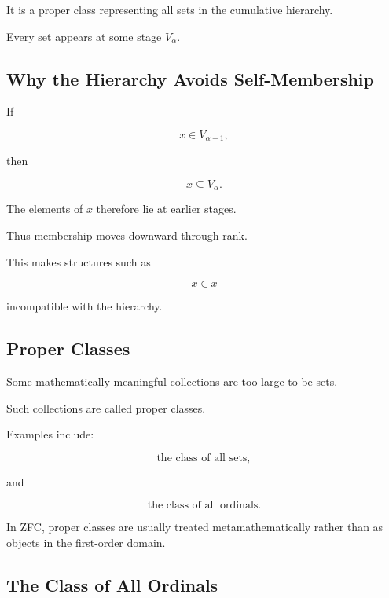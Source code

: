 It is a proper class representing all sets in the cumulative hierarchy.

Every set appears at some stage \(V_\alpha\).

\subsection{Why the Hierarchy Avoids Self-Membership}
\label{subsec:hierarchy-no-self-membership}

If

\[
x\in V_{\alpha+1},
\]

then

\[
x\subseteq V_\alpha.
\]

The elements of \(x\) therefore lie at earlier stages.

Thus membership moves downward through rank.

This makes structures such as

\[
x\in x
\]

incompatible with the hierarchy.

\subsection{Proper Classes}
\label{subsec:proper-classes}

Some mathematically meaningful collections are too large to be sets.

Such collections are called proper classes.

Examples include:

\[
\boxed{
\text{the class of all sets},
}
\]

and

\[
\boxed{
\text{the class of all ordinals}.
}
\]

In ZFC, proper classes are usually treated metamathematically rather than as
objects in the first-order domain.

\subsection{The Class of All Ordinals}
\label{subsec:class-all-ordinals}

